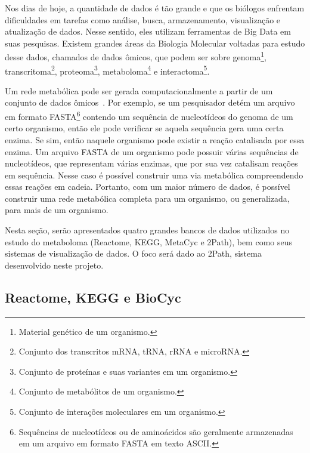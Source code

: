 
\indent Nos dias de hoje, a quantidade de dados é tão grande e  que os biólogos enfrentam dificuldades em tarefas como análise, busca, armazenamento, visualização e atualização de dados. Nesse sentido, eles utilizam ferramentas de Big Data em suas pesquisas. Existem grandes áreas da Biologia Molecular voltadas para estudo desse dados, chamados de dados ômicos, que podem ser sobre genoma\footnote{Material genético de um organismo.}, transcritoma\footnote{Conjunto dos transcritos mRNA, tRNA, rRNA e microRNA.}, proteoma\footnote{Conjunto de proteínas e suas variantes em um organismo.}, metaboloma\footnote{Conjunto de metabólitos de um organismo.} e interactoma\footnote{Conjunto de interações moleculares em um organismo.}.

\indent Um rede metabólica pode ser gerada computacionalmente a partir de um conjunto de dados ômicos~\cite{pireddu06}. Por exemplo, se um pesquisador detém um arquivo em formato FASTA\footnote{Sequências de nucleotídeos ou de aminoácidos são geralmente armazenadas em um arquivo em formato FASTA em texto ASCII.} contendo um sequência de nucleotídeos do genoma de um certo organismo, então ele pode verificar se aquela sequência gera uma certa enzima. Se sim, então naquele organismo pode existir a reação catalisada por essa enzima. Um arquivo FASTA de um organismo pode possuir várias sequências de nucleotídeos, que representam várias enzimas, que por sua vez catalisam reações em sequência. Nesse caso é possível construir uma via metabólica compreendendo essas reações em cadeia. Portanto, com um maior número de dados, é possível construir uma rede metabólica completa para um organismo, ou generalizada, para mais de um organismo.

\indent Nesta seção, serão apresentados quatro grandes bancos de dados utilizados no estudo do metaboloma (Reactome, KEGG, MetaCyc e 2Path), bem como seus sistemas de visualização de dados. O foco será dado ao 2Path, sistema desenvolvido neste projeto. 


\subsection{Reactome, KEGG e BioCyc}


